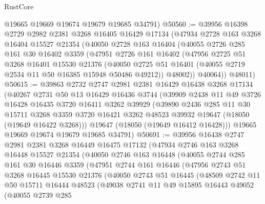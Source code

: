 \begin{lexlean}{RustCore}
\begin{coremodule}
      @19665
      @19669
      @19674
      @19679
      @19685
      @34791)
@50560 := @39956
    @16398
    @2729
    @2982
    @2381
    @3268
    @16405
    @16429
    @17134
    (@47934
      @2728
      @163
      @3268
      @16404
      @15527
      @21354
      (@40050
        @2728
        @163
        @16404
        (@40055
          @2726
          @285
          @161
          @30
          @16402
          @3359
          (@47951
            @2726
            @161
            @16402
            (@47956
              @2725
              @51
              @3268
              @16401
              @15530
              @21376
              (@40050 @2725 @51 @16401 (@40055 @2719 @2534 @11 @50 @16385 @15948 @50486 @49212))
              @48002))
          @40064))
      @48011)
@50615 := @39863
    @2732
    @2747
    @2981
    @2381
    @16429
    @16438
    @3268
    @17134
    (@40267
      @2731
      @50
      @13
      @16429
      @16436
      @3744
      (@39909
        @2438
        @11
        @49
        @3726
        @16428
        @16435
        @3720
        @16411
        @3262
        @39929
        (@39890
          @2436
          @285
          @11
          @30
          @15711
          @3268
          @3359
          @3720
          @16421
          @3262
          @48523
          @39932
          @19647
          (@18050 (@19649 @16422 @3268)))
        @19647
        (@18050 (@19649 @16412 @16428)))
      @19665
      @19669
      @19674
      @19679
      @19685
      @34791)
@50691 := @39956
    @16438
    @2747
    @2981
    @2381
    @3268
    @16449
    @16475
    @17132
    (@47934
      @2746
      @163
      @3268
      @16448
      @15527
      @21354
      (@40050
        @2746
        @163
        @16448
        (@40055
          @2744
          @285
          @161
          @30
          @16446
          @3359
          (@47951
            @2744
            @161
            @16446
            (@47956
              @2743
              @51
              @3268
              @16445
              @15530
              @21376
              (@40050
                @2743
                @51
                @16445
                (@48509
                  @2742
                  @11
                  @50
                  @15711
                  @16444
                  @48523
                  (@49038
                    @2741
                    @11
                    @49
                    @15895
                    @16443
                    @49052
                    (@40055
                      @2739
                      @285

\end{coremodule}
\end{lexlean}

